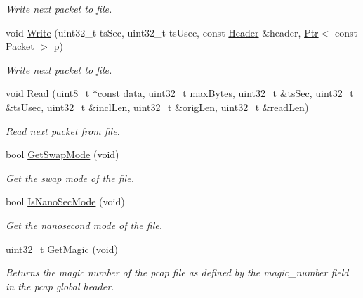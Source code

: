 \begin{DoxyCompactItemize}
\begin{DoxyCompactList}\small\item\em Write next packet to file. \end{DoxyCompactList}\item 
void \hyperlink{classns3_1_1PcapFile_a057ede1e4feda72362d20d7f14c4e836}{Write} (uint32\+\_\+t ts\+Sec, uint32\+\_\+t ts\+Usec, const \hyperlink{classns3_1_1Header}{Header} \&header, \hyperlink{classns3_1_1Ptr}{Ptr}$<$ const \hyperlink{classns3_1_1Packet}{Packet} $>$ \hyperlink{lte__link__budget__x2__handover__measures_8m_ac9de518908a968428863f829398a4e62}{p})
\begin{DoxyCompactList}\small\item\em Write next packet to file. \end{DoxyCompactList}\item 
void \hyperlink{classns3_1_1PcapFile_a18c5045735408fe45a8cbc9e6b34a4fb}{Read} (uint8\+\_\+t $\ast$const \hyperlink{topology-example-sim_8cc_a26c65296e316af77b787dc77469bb2a4}{data}, uint32\+\_\+t max\+Bytes, uint32\+\_\+t \&ts\+Sec, uint32\+\_\+t \&ts\+Usec, uint32\+\_\+t \&incl\+Len, uint32\+\_\+t \&orig\+Len, uint32\+\_\+t \&read\+Len)
\begin{DoxyCompactList}\small\item\em Read next packet from file. \end{DoxyCompactList}\item 
bool \hyperlink{classns3_1_1PcapFile_af4e258052b9350be97672eb30f3428c2}{Get\+Swap\+Mode} (void)
\begin{DoxyCompactList}\small\item\em Get the swap mode of the file. \end{DoxyCompactList}\item 
bool \hyperlink{classns3_1_1PcapFile_ab19447f457118e7b345d4dc971d11c77}{Is\+Nano\+Sec\+Mode} (void)
\begin{DoxyCompactList}\small\item\em Get the nanosecond mode of the file. \end{DoxyCompactList}\item 
uint32\+\_\+t \hyperlink{classns3_1_1PcapFile_ac32dd628aa09604ae0280ad87bafe105}{Get\+Magic} (void)
\begin{DoxyCompactList}\small\item\em Returns the magic number of the pcap file as defined by the magic\+\_\+number field in the pcap global header. \end{DoxyCompactList}\item 

\end{DoxyCompactItemize}
